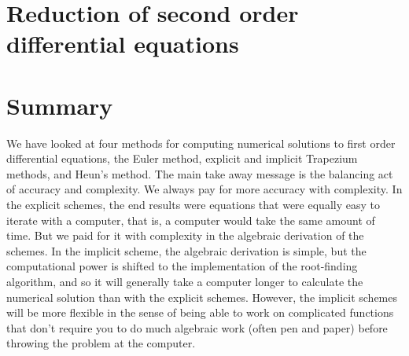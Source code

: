 \section{Reduction of second order differential equations}


\section{Summary}
We have looked at four methods for computing numerical solutions to first order differential equations, the Euler method, explicit and implicit Trapezium methods, and Heun's method. The main take away message is the balancing act of accuracy and complexity. We always pay for more accuracy with complexity. In the explicit schemes, the end results were equations that were equally easy to iterate with a computer, that is, a computer would take the same amount of time. But we paid for it with complexity in the algebraic derivation of the schemes. In the implicit scheme, the algebraic derivation is simple, but the computational power is shifted to the implementation of the root-finding algorithm, and so it will generally take a computer longer to calculate the numerical solution than with the explicit schemes. However, the implicit schemes will be more flexible in the sense of being able to work on complicated functions that don't require you to do much algebraic work (often pen and paper) before throwing the problem at the computer.






